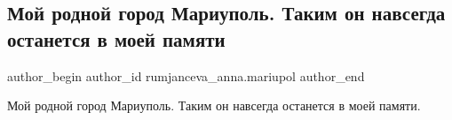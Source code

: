  
 
 
 
 

\subsection{Мой родной город Мариуполь. Таким он навсегда останется в моей памяти}
\label{sec:24_02_2023.fb.rumjanceva_anna.mariupol.1.moi_rodnoi_gorod_mar}

\ifcmt
 author_begin
   author_id rumjanceva_anna.mariupol
 author_end
\fi

Мой родной город Мариуполь. Таким он навсегда останется в моей памяти.

